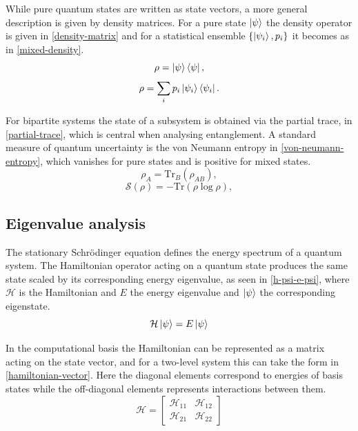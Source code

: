 While pure quantum states are written as state vectors, a more general description is given by density matrices. For a pure state $\left| \psi \right\rangle$ the density operator is given in \cref{density-matrix} and for a statistical ensemble $\{\left| \psi_i \right\rangle,p_i\}$ it becomes as in \cref{mixed-density}.
\begin{equation}\label{density-matrix}
\rho = \left| \psi \right\rangle\left\langle \psi \right|,
\end{equation}
\begin{equation}\label{mixed-density}
\rho = \sum_i p_i \left| \psi_i \right\rangle\left\langle \psi_i \right|.
\end{equation}

For bipartite systems the state of a subsystem is obtained via the partial trace, in  \cref{partial-trace}, which is central when analysing entanglement. A standard measure of quantum uncertainty is the von Neumann entropy in \cref{von-neumann-entropy}, which vanishes for pure states and is positive for mixed states.
\begin{equation}\label{partial-trace}
\rho_A = \mathrm{Tr}_B(\rho_{AB}),
\end{equation}
\begin{equation}\label{von-neumann-entropy}
\mathcal{S}(\rho) = -\mathrm{Tr}(\rho \log \rho),
\end{equation}

\subsection{Eigenvalue analysis}

The stationary Schrödinger equation defines the energy spectrum of a quantum system. The Hamiltonian operator acting on a quantum state produces the same state scaled by its corresponding energy eigenvalue, as seen in \cref{h-psi-e-psi}, where $\mathcal{H}$ is the Hamiltonian and $E$ the energy eigenvalue and $\left| \psi \right\rangle$ the corresponding eigenstate.
\begin{equation}\label{h-psi-e-psi}
    \mathcal{H}\left| \psi \right\rangle=E\left| \psi \right\rangle
\end{equation}

In the computational basis the Hamiltonian can be represented as a matrix acting on the state vector, and for a two-level system this can take the form in \cref{hamiltonian-vector}. Here the diagonal elements correspond to energies of basis states while the off-diagonal elements represents interactions between them.
\begin{equation}\label{hamiltonian-vector}
    \mathcal{H}=\begin{bmatrix}
        \mathcal{H}_{11} & \mathcal{H}_{12} \\
        \mathcal{H}_{21} & \mathcal{H}_{22}
    \end{bmatrix}
\end{equation}

